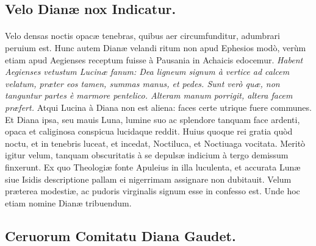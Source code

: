 \documentclass[a4paper, 11pt, oneside, polutonikogreek, latin]{article}
\begin{document}
\subsection{Velo Dianæ nox Indicatur.}
\paragraph{}
Velo densas noctis opacæ tenebras, quibus aer circumfunditur, adumbrari peruium est. Hunc autem Dianæ velandi ritum non apud Ephesios modò, verùm etiam apud Aegienses receptum fuisse à Pausania in Achaicis edocemur. \emph{Habent Aegienses vetustum Lucinæ fanum: Dea ligneum signum à vertice ad calcem velatum, præter eos tamen, summas manus, et pedes. Sunt verò quæ, non tanguntur partes è marmore pentelico. Alteram manum porrigit, altera facem præfert.} Atqui Lucina à Diana non est aliena: faces certe utrique fuere communes. Et Diana ipsa, seu mauis Luna, lumine suo ac splendore tanquam face ardenti, opaca et caliginosa conspicua lucidaque reddit. Huius quoque rei gratia quòd noctu, et in tenebris luceat, et incedat, Noctiluca, et Noctiuaga vocitata. Meritò igitur velum, tanquam obscuritatis à se depulsæ indicium à tergo demissum finxerunt. Ex quo Theologiæ fonte Apuleius in illa luculenta, et accurata Lunæ siue Isidis descriptione pallam ei nigerrimam assignare non dubitauit. Velum præterea modestiæ, ac pudoris virginalis signum esse in confesso est. Unde hoc etiam nomine Dianæ tribuendum.
\clearpage
\subsection{Ceruorum Comitatu Diana Gaudet.}
\end{document}
